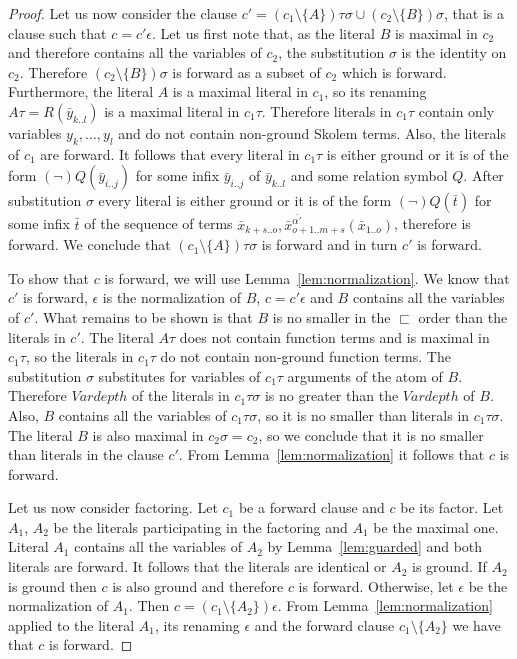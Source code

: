\documentclass[english, shortabstract]{iithesis}
\theoremstyle{definition} \newtheorem{definition}{Definition}[chapter]
\theoremstyle{remark} \newtheorem{remark}[definition]{Observation}
\theoremstyle{plain} \newtheorem{theorem}[definition]{Theorem}
\theoremstyle{plain} \newtheorem{lemma}[definition]{Lemma}
\begin{document}
\begin{proof}
Let us now consider the clause $c'=(c_1\setminus\{A\})\tau\sigma \cup (c_2\setminus\{B\})\sigma$, 
that is a clause such that $c=c'\epsilon$.
Let us first note that, as the literal $B$ is maximal in $c_2$ and therefore contains all the variables of $c_2$, 
the substitution $\sigma$ is the identity on $c_2$. Therefore $(c_2\setminus\{B\})\sigma$ is forward as a subset of $c_2$ which is forward.
Furthermore, the literal $A$ is a maximal literal in $c_1$, so its renaming $A\tau=R(\bar{y}_{k..l})$ is a maximal literal in $c_1\tau$.
Therefore literals in $c_1\tau$ contain only variables $y_k,\dots,y_l$ and do not contain non-ground Skolem terms.
Also, the literals of $c_1$ are forward.
It follows that every literal in $c_1\tau$ is either ground or it is of the form $(\lnot)Q(\bar{y}_{i..j})$ for some infix $\bar{y}_{i..j}$ of $\bar{y}_{k..l}$ and some relation symbol $Q$.
After substitution $\sigma$ every literal is either ground or it is of the form $(\lnot)Q(\bar{t})$ for some infix $\bar{t}$ of the sequence of terms $\bar{x}_{k+s..o}, \bar{x}^{\bar{\alpha'}}_{{o+1..m+s}}(\bar{x}_{1..o})$, therefore is forward.
We conclude that $(c_1\setminus\{A\})\tau\sigma$ is forward and in turn $c'$ is forward.

To show that $c$ is forward, we will use Lemma~\ref{lem:normalization}.
We know that $c'$ is forward, $\epsilon$ is the normalization of $B$, $c=c'\epsilon$ and $B$ contains all the variables of $c'$.
What remains to be shown is that $B$ is no smaller in the $\sqsubset$ order than the literals in $c'$.
The literal $A\tau$ does not contain function terms and is maximal in $c_1\tau$, 
so the literals in $c_1\tau$ do not contain non-ground function terms.
The substitution $\sigma$ substitutes for variables of $c_1\tau$ arguments of the atom of $B$.
Therefore $\mathit{Vardepth}$ of the literals in $c_1\tau\sigma$ is no greater than the $\mathit{Vardepth}$ of $B$.
Also, $B$ contains all the variables of $c_1\tau\sigma$, so it is no smaller than literals in $c_1\tau\sigma$.
The literal $B$ is also maximal in $c_2\sigma=c_2$, so we conclude that it is no smaller than literals in the clause $c'$.
From Lemma~\ref{lem:normalization} it follows that $c$ is forward.

\par Let us now consider factoring. Let $c_1$ be a forward clause and $c$ be its factor.
Let $A_1$, $A_2$ be the literals participating in the factoring and $A_1$ be the maximal one.
Literal $A_1$ contains all the variables of $A_2$ by Lemma~\ref{lem:guarded} and both literals are forward. 
It follows that the literals are identical or $A_2$ is ground. If $A_2$ is ground then $c$ is also ground and therefore $c$ is forward.
Otherwise, let $\epsilon$ be the normalization of $A_1$.
Then $c=(c_1\setminus\{A_2\})\epsilon$. From Lemma~\ref{lem:normalization} applied to the 
literal $A_1$, its renaming $\epsilon$ and the forward clause $c_1\setminus\{A_2\}$ we have that $c$ is forward.
\end{proof}
\end{document}

